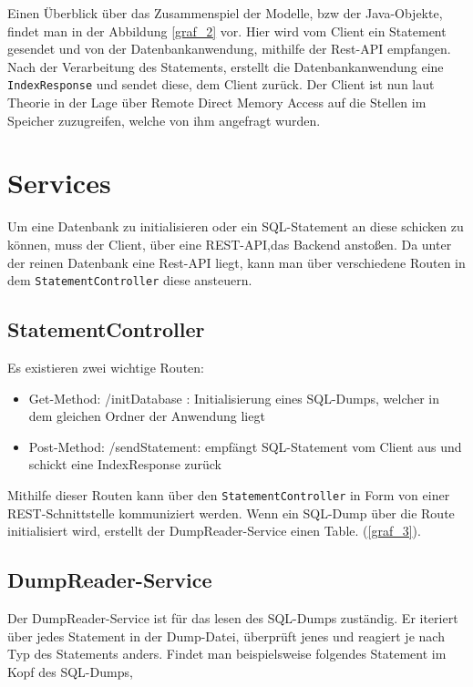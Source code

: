 Einen Überblick über das Zusammenspiel der Modelle, bzw der Java-Objekte, findet man in der Abbildung \ref{graf_2} vor. 
Hier wird vom Client ein Statement gesendet und von der Datenbankanwendung, mithilfe der Rest-API empfangen. Nach der Verarbeitung des Statements, erstellt die Datenbankanwendung eine \texttt{IndexResponse} und sendet diese, dem Client zurück.
Der Client ist nun laut Theorie in der Lage über Remote Direct Memory Access auf die Stellen im Speicher zuzugreifen, welche von ihm angefragt wurden.


\section{Services}
Um eine Datenbank zu initialisieren oder ein SQL-Statement an diese schicken zu können, muss der Client, über eine REST-API,das Backend anstoßen.
Da unter der reinen Datenbank eine Rest-API liegt, kann man über verschiedene Routen in dem \texttt{StatementController} diese ansteuern.


\subsection{StatementController}
Es existieren zwei wichtige Routen:

\begin{itemize}
 \item Get-Method: /initDatabase : Initialisierung eines SQL-Dumps, welcher in dem gleichen Ordner der Anwendung liegt
 \item Post-Method: /sendStatement: empfängt SQL-Statement vom Client aus und schickt eine IndexResponse zurück
\end{itemize}

Mithilfe dieser Routen kann über den \texttt{StatementController} in Form von einer REST-Schnittstelle kommuniziert werden.
Wenn ein SQL-Dump über die Route initialisiert wird, erstellt der DumpReader-Service einen Table. (\ref{graf_3}). 


\subsection{DumpReader-Service}
\label{DumpReader}
Der DumpReader-Service ist für das lesen des SQL-Dumps zuständig. Er iteriert über jedes Statement in der Dump-Datei, überprüft jenes und reagiert je nach Typ des Statements anders.
Findet man beispielsweise folgendes Statement im Kopf des SQL-Dumps,
\\

